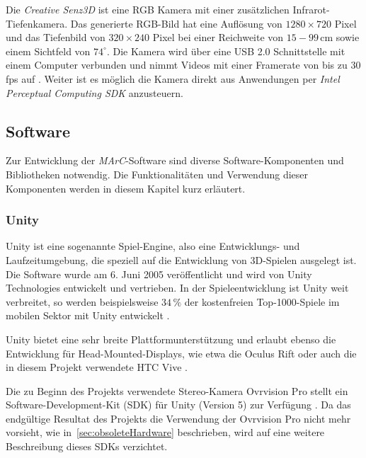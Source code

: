 Die \textit{Creative Senz3D} ist eine RGB Kamera mit einer zusätzlichen Infrarot-Tiefenkamera. Das generierte RGB-Bild hat eine Auflösung von $1280\times720$ Pixel und das Tiefenbild von $320\times240$ Pixel bei einer Reichweite von $15-99\,$cm sowie einem Sichtfeld von $74^\circ$. Die Kamera wird über eine USB 2.0 Schnittstelle mit einem Computer verbunden und nimmt Videos mit einer Framerate von bis zu $30$ fps auf \cite{website:Senz3d}. Weiter ist es möglich die Kamera direkt aus Anwendungen per \textit{Intel Perceptual Computing SDK} anzusteuern.

\subsection{Software} 

Zur Entwicklung der \textit{MArC}-Software sind diverse Software-Komponenten und Bibliotheken notwendig. Die Funktionalitäten und Verwendung dieser Komponenten werden in diesem Kapitel kurz erläutert.


\subsubsection{Unity}\label{sec:unity}

Unity ist eine sogenannte Spiel-Engine, also eine Entwicklungs- und Laufzeitumgebung, die speziell auf die Entwicklung von 3D-Spielen ausgelegt ist. Die Software wurde am 6. Juni 2005 veröffentlicht \cite{haas2014history} und wird von Unity Technologies \cite{website:Unity} entwickelt und vertrieben. In der Spieleentwicklung ist Unity weit verbreitet, so werden beispielsweise $34\,\%$ der kostenfreien Top-1000-Spiele im mobilen Sektor mit Unity entwickelt \cite{website:UnityPR}.

Unity bietet eine sehr breite Plattformunterstützung \cite{website:UnityMultiPlatform} und erlaubt ebenso die Entwicklung für Head-Mounted-Displays, wie etwa die Oculus Rift \cite{website:UnityOculus}\cite{website:UnityVRoverview} oder auch die in diesem Projekt verwendete HTC Vive \cite{website:UnityVRoverview}.

Die zu Beginn des Projekts verwendete Stereo-Kamera Ovrvision Pro stellt ein Software-Development-Kit (SDK) für Unity (Version 5) zur Verfügung \cite{website:ovrvisionSetup}. Da das endgültige Resultat des Projekts die Verwendung der Ovrvision Pro nicht mehr vorsieht, wie in~\ref{sec:obsoleteHardware} beschrieben, wird auf eine weitere Beschreibung dieses SDKs verzichtet.

